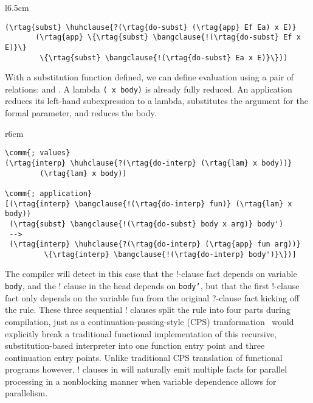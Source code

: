 \begin{wrapfigure}{l}{6.5cm}
\begin{Verbatim}[baselinestretch=0.8,commandchars=\\\{\}]
(\rtag{subst} \huhclause{?(\rtag{do-subst} (\rtag{app} Ef Ea) x E)}
       (\rtag{app} \{\rtag{subst} \bangclause{!(\rtag{do-subst} Ef x E)}\}
	    \{\rtag{subst} \bangclause{!(\rtag{do-subst} Ea x E)}\}))
\end{Verbatim}
\end{wrapfigure}
%
With a substitution function defined, we can define evaluation using a pair of relations:  and . A lambda \texttt{( x body)} is already fully reduced. An application reduces its left-hand subexpression to a lambda, substitutes the argument for the formal parameter, and reduces the body. 

\begin{wrapfigure}{r}{6cm}
\vspace{-0.15cm}
\begin{Verbatim}[baselinestretch=0.8,commandchars=\\\{\}]
\comm{; values}
(\rtag{interp} \huhclause{?(\rtag{do-interp} (\rtag{lam} x body))}
        (\rtag{lam} x body))

\comm{; application}
[(\rtag{interp} \bangclause{!(\rtag{do-interp} fun)} (\rtag{lam} x body))
 (\rtag{subst} \bangclause{!(\rtag{do-subst} body x arg)} body')
 -->
 (\rtag{interp} \huhclause{?(\rtag{do-interp} (\rtag{app} fun arg))}
         \{\rtag{interp} \bangclause{!(\rtag{do-interp} body')}\})]
\end{Verbatim}
\end{wrapfigure}
%
The compiler will detect in this case that the  !-clause fact depends on variable \texttt{body}, and the  ! clause in the head depends on \texttt{body'}, but that the first  !-clause fact only depends on the variable fun from the original ?-clause fact kicking off the rule. These three sequential ! clauses split the rule into four parts during compilation, just as a continuation-passing-style (CPS) tranformation~\cite{appel2007compiling} would explicitly break a traditional functional implementation of this recursive, substitution-based interpreter into one function entry point and three continuation entry points. Unlike traditional CPS translation of functional programs however, ! clauses in \slog{} will naturally emit multiple facts for parallel processing in a nonblocking manner when variable dependence allows for parallelism. 








